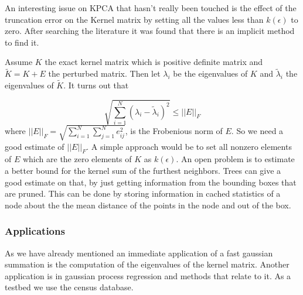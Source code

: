 \documentclass[12pt,letterpaper,doublespaced,ETD,dvips,proposal]{gtthesis}
\begin{document}
\begin{Body}
An interesting issue on KPCA that hasn't really been touched is the
effect of the truncation error on the Kernel matrix by setting all
the values less than $k(\epsilon)$ to zero. After searching the
literature it was found that there is an implicit method to find it.

Assume $K$ the exact kernel matrix which is positive definite matrix
and $\tilde{K}=K+E$ the perturbed matrix. Then let $\lambda_i$ be
the eigenvalues of $K$ and $\tilde{\lambda}_i$ the eigenvalues of
$\tilde{K}$. It turns out \cite{stewart1990mpt} that

\begin{equation}
\sqrt{\sum_{i=1}^{N}(\lambda_i-\tilde{\lambda}_i)^2}\leq ||E||_F
\end{equation}
where $||E||_F=\sqrt{\sum_{i=1}^{N}\sum_{j=1}^{N}e_{ij}^2}$, is the
Frobenious norm of $E$.
So we need a good estimate of $||E||_F$. A simple approach would be
to set all nonzero elements of $E$ which are the zero elements of
$K$ as $k(\epsilon)$.  An open problem is to estimate a better bound
for the kernel sum of the furthest neighbors. Trees can give  a good
estimate on that, by just getting information from the bounding
boxes that are pruned. This can be done by storing information in cached statistics of 
a node about the the mean distance of the points in the node and out of the box.

\subsubsection{Applications}
As we have already mentioned an immediate application of a fast gaussian summation is the 
computation of the eigenvalues of the kernel matrix. Another application is in gaussian process
regression and methods that relate to it. As a testbed we use the census database.


\end{Body}
\end{document}
